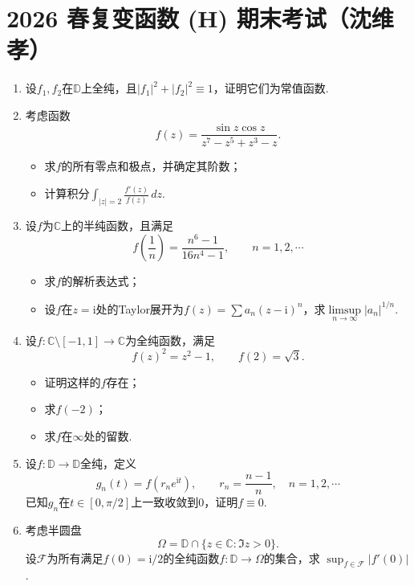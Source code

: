 \section*{2026 春复变函数 (H) 期末考试（沈维孝）}
\begin{enumerate}
    \item 设$f_{1}, f_{2}$在$\mathbb{D}$上全纯，且$|f_{1}|^{2}+|f_{2}|^{2}\equiv 1$，证明它们为常值函数.
    \item 考虑函数
    $$
    f(z)=\frac{\sin z\cos z}{z^{7}-z^{5}+z^{3}-z}.
    $$
    \begin{itemize}
        \item[(1)] 求$f$的所有零点和极点，并确定其阶数；
        \item[(2)] 计算积分$\displaystyle\int_{|z|=2}\frac{f'(z)}{f(z)}\,dz$.
    \end{itemize}
    \item 设$f$为$\mathbb{C}$上的半纯函数，且满足
    $$
    f\left(\frac{1}{n}\right)=\frac{n^{6}-1}{16n^{4}-1},\qquad n=1,2,\cdots
    $$
    \begin{itemize}
        \item[(1)] 求$f$的解析表达式；
        \item[(2)] 设$f$在$z=\mathrm{i}$处的Taylor展开为$f(z)=\sum a_{n}(z-\mathrm{i})^{n}$，求$\limsup\limits_{n\to\infty}|a_{n}|^{1/n}$.
    \end{itemize}
    \item 设$f:\mathbb{C}\setminus[-1,1]\to\mathbb{C}$为全纯函数，满足
    $$
    f(z)^{2}=z^{2}-1,\qquad f(2)=\sqrt{3}.
    $$
    \begin{itemize}
        \item[(1)] 证明这样的$f$存在；
        \item[(2)] 求$f(-2)$；
        \item[(3)] 求$f$在$\infty$处的留数.
    \end{itemize}
    \item 设$f:\mathbb{D}\to\mathbb{D}$全纯，定义
    $$
    g_{n}(t)=f(r_{n}e^{\mathrm{i} t}),\qquad r_{n}=\frac{n-1}{n},\quad n=1,2,\cdots
    $$
    已知$g_{n}$在$t\in[0,\pi/2]$上一致收敛到$0$，证明$f\equiv 0$.
    \item 考虑半圆盘
    $$
    \Omega=\mathbb{D}\cap\{z\in\mathbb{C}:\Im z>0\}.
    $$
    设$\mathcal{F}$为所有满足$f(0)=\mathrm{i}/2$的全纯函数$f:\mathbb{D}\to\Omega$的集合，求 $\sup_{f\in\mathcal{F}}|f'(0)|$.
\end{enumerate}
